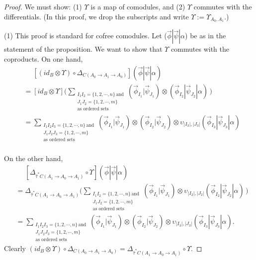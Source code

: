 \begin{proof}
We must show: (1) $\Upsilon$ is a map of comodules, and 
(2) $\Upsilon$ commutes with the differentials. (In this 
proof, we drop the subscripts and write 
$\Upsilon := \Upsilon_{A_0, A_1}$.)

(1) This proof is standard for cofree comodules. 
Let ($\vec{\phi} | \vec{\psi} | \alpha$) be as 
in the statement of the proposition. We want to 
show that $\Upsilon$ commutes with the coproducts. 
On one hand,
\begin{align*}
&\phantom{{}={}}
[(id_B \otimes \Upsilon) \circ 
  \Delta_{C(A_0 \to A_1 \to A_0)}] 
  ( \vec{\phi} | \vec{\psi} | \alpha ) \\
&= [id_B \otimes \Upsilon]
	\big( \sum_{\substack{I_1I_2 = \{1,2,\cdots,n\} \, \textrm{and} \\ 
						  J_1J_2 = \{1,2,\cdots,m\} \\
				          \textrm{as ordered sets}}} 
    (\vec{\phi}_{I_1} | \vec{\psi}_{J_1}) \otimes (\vec{\phi}_{I_2} | \vec{\psi}_{J_2} | \alpha) \, \big) \\
&= \sum_{\substack{I_1I_2I_3 = \{1,2,\cdots,n\} \, \textrm{and} \\ 
				   J_1J_2J_3 = \{1,2,\cdots,m\} \\
				   \textrm{as ordered sets}}} 
    (\vec{\phi}_{I_1} | \vec{\psi}_{J_1}) \otimes 
    (\vec{\phi}_{I_2} | \vec{\psi}_{J_2}) \otimes 
    \upsilon_{|I_3|,|J_3|}(\vec{\phi}_{I_3} | \vec{\psi}_{J_3} | \alpha) \\
\end{align*}

On the other hand,
\begin{align*}
&\phantom{{}={}}
[\Delta_{\hat{\tau}^*C(A_1 \to A_0 \to A_1)} 
  \circ \Upsilon ]
  ( \vec{\phi} | \vec{\psi} | \alpha ) \\
&= \Delta_{\hat{\tau}^*C(A_1 \to A_0 \to A_1)}
	\big( \sum_{\substack{I_1I_2 = \{1,2,\cdots,n\} \, \textrm{and} \\ 
						  J_1J_2 = \{1,2,\cdots,m\} \\
				          \textrm{as ordered sets}}}
	(\vec{\phi}_{I_1} | \vec{\psi}_{J_1}) \otimes 
    \upsilon_{|I_2|,|J_2|}(\vec{\phi}_{I_2} | \vec{\psi}_{J_2} | \alpha) \, \big)\\
&= \sum_{\substack{I_1I_2I_3 = \{1,2,\cdots,n\} \, \textrm{and} \\ 
				   J_1J_2J_3 = \{1,2,\cdots,m\} \\
				   \textrm{as ordered sets}}} 
    (\vec{\phi}_{I_1} | \vec{\psi}_{J_1}) \otimes 
    (\vec{\phi}_{I_2} | \vec{\psi}_{J_2}) \otimes 
    \upsilon_{|I_3|,|J_3|}(\vec{\phi}_{I_3} | \vec{\psi}_{J_3} | \alpha).   				          
\end{align*}
Clearly $(id_B \otimes \Upsilon) \circ 
\Delta_{C(A_0 \to A_1 \to A_0)} = 
\Delta_{\hat{\tau}^*C(A_1 \to A_0 \to A_1)} 
\circ \Upsilon$.


\end{proof}
